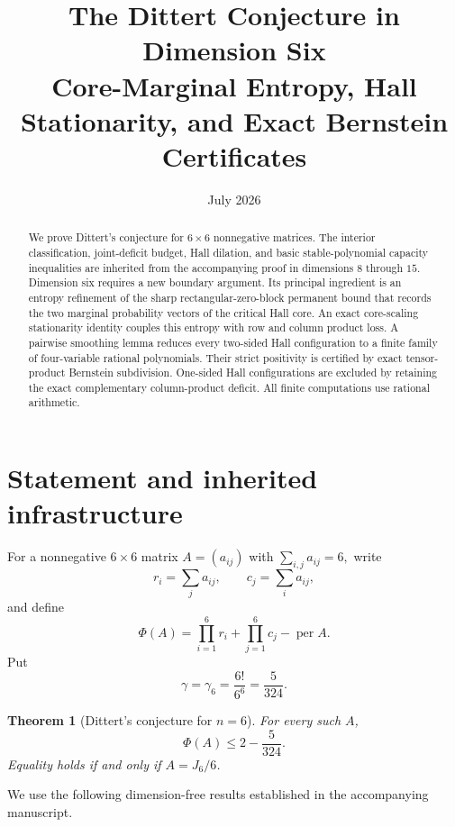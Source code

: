 \documentclass[11pt]{article}
\title{The Dittert Conjecture in Dimension Six\\
\large Core-Marginal Entropy, Hall Stationarity, and Exact Bernstein Certificates}
\author{}
\date{July 2026}
\newtheorem{theorem}{Theorem}[section]
\theoremstyle{definition}
\DeclareMathOperator{\permop}{per}
\newcommand{\g}{\gamma}
\begin{document}
\maketitle

\begin{abstract}
We prove Dittert's conjecture for $6\times6$ nonnegative matrices.  The
interior classification, joint-deficit budget, Hall dilation, and basic
stable-polynomial capacity inequalities are inherited from the accompanying
proof in dimensions $8$ through $15$.  Dimension six requires a new boundary
argument.  Its principal ingredient is an entropy refinement of the sharp
rectangular-zero-block permanent bound that records the two marginal
probability vectors of the critical Hall core.  An exact core-scaling
stationarity identity couples this entropy with row and column product loss.
A pairwise smoothing lemma reduces every two-sided Hall configuration to a
finite family of four-variable rational polynomials.  Their strict positivity
is certified by exact tensor-product Bernstein subdivision.  One-sided Hall
configurations are excluded by retaining the exact complementary
column-product deficit.  All finite computations use rational arithmetic.
\end{abstract}

\section{Statement and inherited infrastructure}

For a nonnegative $6\times6$ matrix $A=(a_{ij})$ with
\(
 \sum_{i,j}a_{ij}=6,
\)
write
\[
 r_i=\sum_j a_{ij},\qquad c_j=\sum_i a_{ij},
\]
and define
\[
 \Phi(A)=\prod_{i=1}^6r_i+\prod_{j=1}^6c_j-\permop A.
\]
Put
\[
 \g=\g_6=\frac{6!}{6^6}=\frac5{324}.
\]

\begin{theorem}[Dittert's conjecture for $n=6$]\label{thm:main}
For every such $A$,
\[
 \Phi(A)\le 2-\frac5{324}.
\]
Equality holds if and only if $A=J_6/6$.
\end{theorem}

We use the following dimension-free results established in the accompanying
manuscript.
\end{document}
